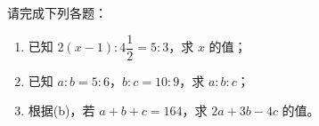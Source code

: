 \documentclass[12pt,a4paper,fontset=none]{exam-zh}
\begin{document}
\begin{question}[points = 10]
    请完成下列各题：

    \begin{enumerate}[label=(\alph*)]
        \item 已知 $2(x-1):4\dfrac{1}{2} = 5:3$，求 $x$ 的值；

        \item 已知 $a:b = 5:6$，$b:c = 10:9$，求 $a:b:c$；

        \item 根据(b)，若 $a+b+c = 164$，求 $2a+3b-4c$ 的值。
    \end{enumerate}
\end{question}
\end{document}
